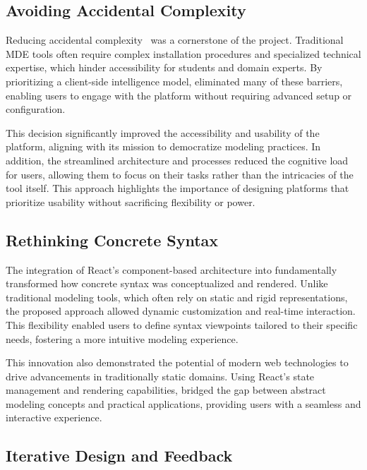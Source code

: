 \subsection{Avoiding Accidental Complexity}

Reducing accidental complexity~\cite{atkinson2008reducing} was a cornerstone of the \jjodel{} project. Traditional MDE tools often require complex installation procedures and specialized technical expertise, which hinder accessibility for students and domain experts. By prioritizing a client-side intelligence model, \jjodel{} eliminated many of these barriers, enabling users to engage with the platform without requiring advanced setup or configuration.

This decision significantly improved the accessibility and usability of the platform, aligning with its mission to democratize modeling practices. In addition, the streamlined architecture and processes reduced the cognitive load for users, allowing them to focus on their tasks rather than the intricacies of the tool itself. This approach highlights the importance of designing platforms that prioritize usability without sacrificing flexibility or power.

\subsection{Rethinking Concrete Syntax}

The integration of React’s component-based architecture into \jjodel{} fundamentally transformed how concrete syntax was conceptualized and rendered. Unlike traditional modeling tools, which often rely on static and rigid representations, the proposed approach allowed dynamic customization and real-time interaction. This flexibility enabled users to define syntax viewpoints tailored to their specific needs, fostering a more intuitive modeling experience.

This innovation also demonstrated the potential of modern web technologies to drive advancements in traditionally static domains. Using React's state management and rendering capabilities, \jjodel{} bridged the gap between abstract modeling concepts and practical applications, providing users with a seamless and interactive experience.

\subsection{Iterative Design and Feedback}

